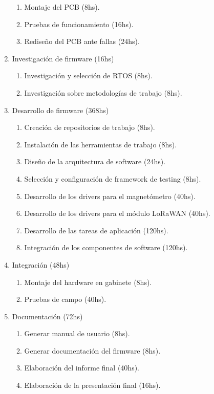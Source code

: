 \documentclass[
11pt, %
]{charter}
\begin{document}
\begin{enumerate}
\begin{enumerate}
				\item Montaje del PCB (8hs).
				\item Pruebas de funcionamiento (16hs).
				\item Rediseño del PCB ante fallas (24hs).
			\end{enumerate}
		\item Investigación de firmware (16hs)
			\begin{enumerate}
				\item Investigación y selección de RTOS (8hs).
				\item Investigación sobre metodologías de trabajo (8hs).
			\end{enumerate}
		\item Desarrollo de firmware (368hs)
			\begin{enumerate}
				\item Creación de repositorios de trabajo (8hs).
				\item Instalación de las herramientas de trabajo (8hs).
				\item Diseño de la arquitectura de software (24hs).
				\item Selección y configuración de framework de testing (8hs).
				\item Desarrollo de los drivers para el magnetómetro (40hs).
				\item Desarrollo de los drivers para el módulo LoRaWAN (40hs).
				\item Desarrollo de las tareas de aplicación (120hs).
				\item Integración de los componentes de software (120hs).
			\end{enumerate}
		\item Integración (48hs)
			\begin{enumerate}
				\item Montaje del hardware en gabinete (8hs).
				\item Pruebas de campo (40hs).
			\end{enumerate}
		\item Documentación (72hs)
			\begin{enumerate}
				\item Generar manual de usuario (8hs).
				\item Generar documentación del firmware (8hs).
				\item Elaboración del informe final (40hs).
				\item Elaboración de la presentación final (16hs).
			\end{enumerate}
	\end{enumerate}
\end{document}
